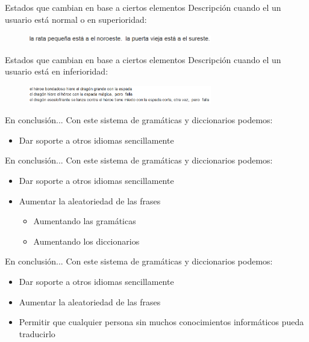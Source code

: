 \begin{tframe}{Estados que cambian en base a ciertos elementos}
	Descripción cuando el un usuario está normal o en superioridad:
		\begin{figure}[h]
			\includegraphics[width=8cm]{../img/estado1.PNG}
		\end{figure}
\end{tframe}

\begin{tframe}{Estados que cambian en base a ciertos elementos}
	Descripción cuando el un usuario está en inferioridad:
		\begin{figure}[h]
			\includegraphics[width=8cm]{../img/estado2.PNG}
		\end{figure}
\end{tframe}


\begin{tframe}{En conclusión...}
	Con este sistema de gramáticas y diccionarios podemos:
	\begin{itemize}
		\item<+-| alert@+> Dar soporte a otros idiomas sencillamente
	\end{itemize}
\end{tframe}

\begin{tframe}{En conclusión...}
	Con este sistema de gramáticas y diccionarios podemos:
	\begin{itemize}
		\item Dar soporte a otros idiomas sencillamente
		\item<+-| alert@+> Aumentar la aleatoriedad de las frases
		\begin{itemize}
			\item Aumentando las gramáticas
			\item Aumentando los diccionarios
		\end{itemize}
	\end{itemize}
\end{tframe}

\begin{tframe}{En conclusión...}
	Con este sistema de gramáticas y diccionarios podemos:
	\begin{itemize}
		\item Dar soporte a otros idiomas sencillamente
		\item Aumentar la aleatoriedad de las frases
		\item<+-| alert@+> Permitir que cualquier persona sin muchos conocimientos informáticos pueda traducirlo
	\end{itemize}
\end{tframe}

